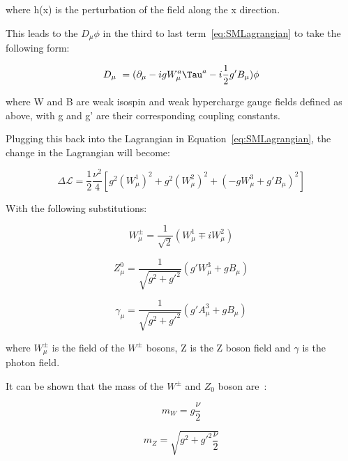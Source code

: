 where h(x) is the perturbation of the field along the x direction.

This leads to the $D_{\mu} \phi$ in the third to last term~\ref{eq:SMLagrangian} to take the following form:

\begin{equation}
    D_{\mu}\ = (\partial_{\mu}- ig W_{\mu}^{a}\Tau^{a} - i\frac{1}{2}g' B_{\mu}) \phi
\end{equation}

where W and B are weak isospin and weak hypercharge gauge fields defined as above, with g and g' are their corresponding coupling constants. %

Plugging this back into the Lagrangian in Equation~\ref{eq:SMLagrangian}, the change in the Lagrangian will become:

\begin{equation}
    \Delta \mathcal{L} = \frac{1}{2} \frac{\nu^{2}}{4}[g^{2}(W^{1}_{\mu})^2 + g^{2}(W_{\mu}^{2})^{2} + (-g W_{\mu}^{3}+ g'B_{\mu})^2]
\end{equation}

With the following substitutions:

\begin{equation}
    W^{\pm}_{\mu} = \frac{1}{\sqrt{2}}(W_{\mu}^{1} \mp iW^{2}_{\mu}) 
\end{equation}

\begin{equation}
    Z^{0}_{\mu}=\frac{1}{\sqrt{g^{2}+g'^{2}}}(g'W_{\mu}^{3} + gB_{\mu})
\end{equation}

\begin{equation}
    \gamma_{\mu} = \frac{1}{\sqrt{g^{2}+g'^{2}}}(g'A^{3}_{\mu} + g B_{\mu})
\end{equation}

where $W^{\pm}_{\mu}$ is the field of the $W^{\pm}$ bosons, Z is the Z boson field and $\gamma$ is the photon field. 

It can be shown that the mass of the $W^{\pm}$ and $Z_{0}$ boson are~\cite{peskin2018introduction}:

\begin{equation}
    m_{W} = g \frac{\nu}{2}
\end{equation}

\begin{equation}
    m_{Z} = \sqrt{g^{2}+ g'^{2}\frac{\nu}{2}}
\end{equation}

